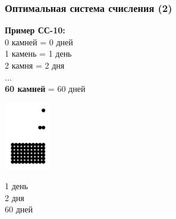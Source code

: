 \documentclass[t, 10pt, handout, aspectratio=169]{beamer}
\begin{document}
\begin{frame}
    \frametitle{Оптимальная система счисления (2)}
    \begin{minipage}[t]{0.4\linewidth}
        \vspace{0pt}
        \textbf{Пример СС-10:} \\
        0 камней = 0 дней \\
        1 камень = 1 день \\
        2 камня = 2 дня \\
        ... \\
        \textbf{60 камней} = 60 дней
    \end{minipage}
    \begin{minipage}[t]{0.2\linewidth}
        \vspace{-6pt}
        \includegraphics[width=2cm, scale=0.4]{logos/crusoe_dots2.png}
    \end{minipage}
    \begin{minipage}[t]{0.2\linewidth}
        \vspace{0pt}
        1 день \\[0.4cm]
        2 дня \\[0.4cm]
        60 дней
    \end{minipage}
\end{frame}
\end{document}
